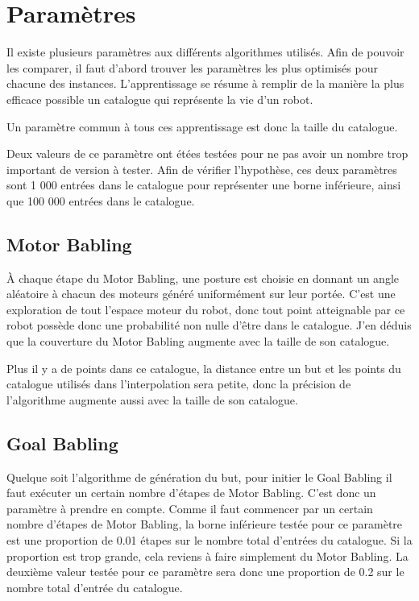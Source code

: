 \documentclass[11pt,french]{report}
\begin{document}
\pagebreak

\section{Paramètres}

Il existe plusieurs paramètres aux différents algorithmes utilisés.
Afin de pouvoir les comparer, il faut d'abord trouver les paramètres les plus optimisés pour chacune des instances.
L'apprentissage se résume à remplir de la manière la plus efficace possible un catalogue qui représente la vie d'un robot.

Un paramètre commun à tous ces apprentissage est donc la taille du catalogue.


Deux valeurs de ce paramètre ont étées testées pour ne pas avoir un nombre trop important de version à tester.
Afin de vérifier l'hypothèse, ces deux paramètres sont 1 000 entrées dans le catalogue pour représenter une borne inférieure, ainsi que 100 000 entrées dans le catalogue.

\subsection{Motor Babling}

\`A chaque étape du Motor Babling, une posture est choisie en donnant un angle aléatoire à chacun des moteurs généré uniformément sur leur portée.
C'est une exploration de tout l'espace moteur du robot, donc tout point atteignable par ce robot possède donc une probabilité non nulle d'être dans le catalogue.
J'en déduis que la couverture du Motor Babling augmente avec la taille de son catalogue.

Plus il y a de points dans ce catalogue, la distance entre un but et les points du catalogue utilisés dans l'interpolation sera petite, donc la précision de l'algorithme augmente aussi avec la taille de son catalogue.

\subsection{Goal Babling}

Quelque soit l'algorithme de génération du but, pour initier le Goal Babling il faut exécuter un certain nombre d'étapes de Motor Babling.
C'est donc un paramètre à prendre en compte.
Comme il faut commencer par un certain nombre d'étapes de Motor Babling, la borne inférieure testée pour ce paramètre est une proportion de 0.01 étapes sur le nombre total d'entrées du catalogue.
Si la proportion est trop grande, cela reviens à faire simplement du Motor Babling.
La deuxième valeur testée pour ce paramètre sera donc une proportion de 0.2 sur le nombre total d'entrée du catalogue.
\end{document}
